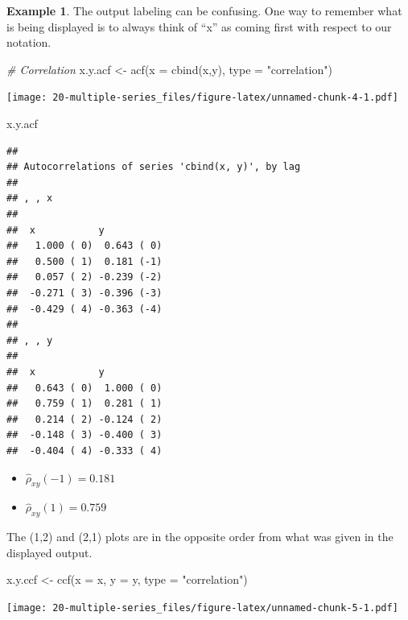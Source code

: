 \documentclass[
]{book}
\newenvironment{Shaded}{\begin{snugshade}}{\end{snugshade}}
\newcommand{\AttributeTok}[1]{\textcolor[rgb]{0.77,0.63,0.00}{#1}}
\newcommand{\CommentTok}[1]{\textcolor[rgb]{0.56,0.35,0.01}{\textit{#1}}}
\newcommand{\FunctionTok}[1]{\textcolor[rgb]{0.00,0.00,0.00}{#1}}
\newcommand{\NormalTok}[1]{#1}
\newcommand{\OtherTok}[1]{\textcolor[rgb]{0.56,0.35,0.01}{#1}}
\newcommand{\StringTok}[1]{\textcolor[rgb]{0.31,0.60,0.02}{#1}}
\theoremstyle{definition}
\theoremstyle{definition}
\newtheorem{example}{Example}[chapter]
\theoremstyle{definition}
\theoremstyle{definition}
\theoremstyle{remark}
\begin{document}
\begin{example}
The output labeling can be confusing. One way to remember what is being displayed is to always think of ``x'' as coming first with respect to our notation.

\begin{Shaded}
\begin{Highlighting}[]
\CommentTok{\# Correlation}
\NormalTok{x.y.acf }\OtherTok{\textless{}{-}} \FunctionTok{acf}\NormalTok{(}\AttributeTok{x =} \FunctionTok{cbind}\NormalTok{(x,y), }\AttributeTok{type =} \StringTok{"correlation"}\NormalTok{)}
\end{Highlighting}
\end{Shaded}

\texttt{[image: 20-multiple-series\_files/figure-latex/unnamed-chunk-4-1.pdf]}

\begin{Shaded}
\begin{Highlighting}[]
\NormalTok{x.y.acf}
\end{Highlighting}
\end{Shaded}

\begin{verbatim}
## 
## Autocorrelations of series 'cbind(x, y)', by lag
## 
## , , x
## 
##  x           y          
##   1.000 ( 0)  0.643 ( 0)
##   0.500 ( 1)  0.181 (-1)
##   0.057 ( 2) -0.239 (-2)
##  -0.271 ( 3) -0.396 (-3)
##  -0.429 ( 4) -0.363 (-4)
## 
## , , y
## 
##  x           y          
##   0.643 ( 0)  1.000 ( 0)
##   0.759 ( 1)  0.281 ( 1)
##   0.214 ( 2) -0.124 ( 2)
##  -0.148 ( 3) -0.400 ( 3)
##  -0.404 ( 4) -0.333 ( 4)
\end{verbatim}

\begin{itemize}
\item
  \(\hat \rho_{xy}(-1)=0.181\)
\item
  \(\hat \rho_{xy}(1)=0.759\)
\end{itemize}

The (1,2) and (2,1) plots are in the opposite order from what was given in the displayed output.

\begin{Shaded}
\begin{Highlighting}[]
\NormalTok{x.y.ccf }\OtherTok{\textless{}{-}} \FunctionTok{ccf}\NormalTok{(}\AttributeTok{x =}\NormalTok{ x, }\AttributeTok{y =}\NormalTok{ y, }\AttributeTok{type =} \StringTok{"correlation"}\NormalTok{)}
\end{Highlighting}
\end{Shaded}

\texttt{[image: 20-multiple-series\_files/figure-latex/unnamed-chunk-5-1.pdf]}


\end{example}
\end{document}
